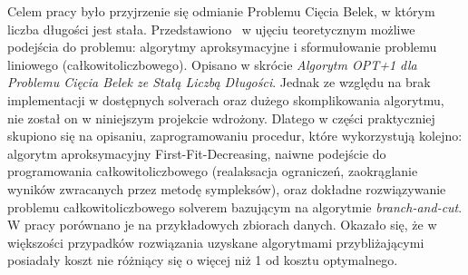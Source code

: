 \begin{streszczenie}

Celem pracy było przyjrzenie się odmianie Problemu Cięcia Belek, w którym liczba długości jest stała. Przedstawiono  w ujęciu teoretycznym możliwe podejścia do problemu: algorytmy aproksymacyjne i sformułowanie problemu liniowego (całkowitoliczbowego). Opisano w skrócie
\textit{Algorytm OPT+1 dla Problemu Cięcia Belek ze Stałą Liczbą Długości}\cite{ALG_OPT_1}. Jednak ze względu na brak implementacji w dostępnych solverach oraz dużego skomplikowania algorytmu, nie został on w niniejszym projekcie wdrożony. Dlatego w części praktyczniej skupiono się na opisaniu, zaprogramowaniu procedur, które wykorzystują kolejno: algorytm aproksymacyjny First-Fit-Decreasing, naiwne podejście do programowania całkowitoliczbowego (realaksacja ograniczeń, zaokrąglanie wyników zwracanych przez metodę sympleksów), oraz dokładne rozwiązywanie problemu całkowitoliczbowego solverem bazującym na algorytmie \textit{branch-and-cut}. W pracy porównano je na przykładowych zbiorach danych. Okazało się, że w większości przypadków rozwiązania uzyskane algorytmami przybliżającymi posiadały koszt nie różniący się o więcej niż 1 od kosztu optymalnego. 
	
\end{streszczenie}
